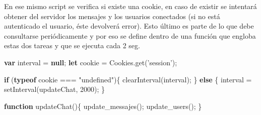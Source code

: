 \documentclass[12pt]{extarticle}
\newenvironment{Shaded}{}{}
\newcommand{\KeywordTok}[1]{\textcolor[rgb]{0.00,0.44,0.13}{\textbf{{#1}}}}
\newcommand{\DataTypeTok}[1]{\textcolor[rgb]{0.56,0.13,0.00}{{#1}}}
\newcommand{\DecValTok}[1]{\textcolor[rgb]{0.25,0.63,0.44}{{#1}}}
\newcommand{\StringTok}[1]{\textcolor[rgb]{0.25,0.44,0.63}{{#1}}}
\newcommand{\NormalTok}[1]{{#1}}
\newcommand{\VariableTok}[1]{\textcolor[rgb]{0.10,0.09,0.49}{{#1}}}
\newcommand{\ControlFlowTok}[1]{\textcolor[rgb]{0.00,0.44,0.13}{\textbf{{#1}}}}
\newcommand{\OperatorTok}[1]{\textcolor[rgb]{0.40,0.40,0.40}{{#1}}}
\newcommand{\AttributeTok}[1]{\textcolor[rgb]{0.49,0.56,0.16}{{#1}}}
\begin{document}
\begin{Shaded}
\end{Shaded}

En ese mismo script se verifica si existe una cookie, en caso de existir
se intentará obtener del servidor los mensajes y los usuarios conectados
(si no está autenticado el usuario, éste devolverá error). Esto último
es parte de lo que debe consultarse periódicamente y por eso se define
dentro de una función que engloba estas dos tareas y que se ejecuta cada
2 seg.

\begin{Shaded}
\begin{Highlighting}[]
\KeywordTok{var}\NormalTok{ interval }\OperatorTok{=} \KeywordTok{null}\OperatorTok{;}
\KeywordTok{let}\NormalTok{ cookie }\OperatorTok{=} \VariableTok{Cookies}\NormalTok{.}\AttributeTok{get}\NormalTok{(}\StringTok{'session'}\NormalTok{)}\OperatorTok{;}

\ControlFlowTok{if}\NormalTok{ (}\KeywordTok{typeof}\NormalTok{ cookie }\OperatorTok{===} \StringTok{"undefined"}\NormalTok{)}\OperatorTok{\{}
    \AttributeTok{clearInterval}\NormalTok{(interval)}\OperatorTok{;}
\OperatorTok{\}} \ControlFlowTok{else} \OperatorTok{\{}       
\NormalTok{    interval }\OperatorTok{=} \AttributeTok{setInterval}\NormalTok{(updateChat}\OperatorTok{,} \DecValTok{2000}\NormalTok{)}\OperatorTok{;}
\OperatorTok{\}}

\KeywordTok{function} \AttributeTok{updateChat}\NormalTok{()}\OperatorTok{\{}
    \AttributeTok{update_messajes}\NormalTok{()}\OperatorTok{;}
    \AttributeTok{update_users}\NormalTok{()}\OperatorTok{;}
\OperatorTok{\}}
\end{Highlighting}
\end{Shaded}
\end{document}
